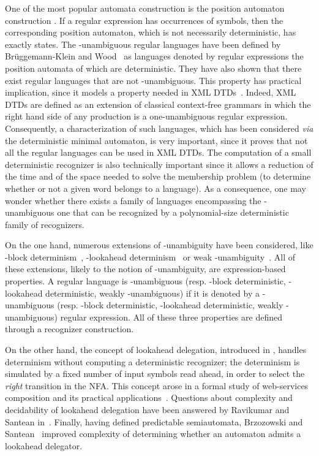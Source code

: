 \documentclass[11pt]{elsarticle}
\newcommand\modif[2]{{#2}}
\begin{document}
One of the \modif{best known}{most popular} automata construction is the position automaton construction \cite{Glu61}. If a regular expression has  occurrences of symbols, then the corresponding position automaton, which is not necessarily deterministic, has exactly  states.
  The -unambiguous  regular languages have been defined by Br\"uggemann-Klein and Wood~\cite{BW98} as  languages denoted  by  regular expressions  the position automata of which are deterministic. They have also shown that there exist regular languages that are not -unambiguous. This property has practical implication, since it models a property needed in XML DTDs~\cite{BPS06}. Indeed, XML DTDs are defined as an extension of classical context-free grammars in which the right hand side of any production is a one-unambiguous regular expression. 
   Consequently, \modif{}{a} characterization of such languages, \modif{that}{which} has been considered \emph{via} the deterministic minimal automaton, is very important, since it proves that not all the regular languages can be used in XML DTDs.  
  The computation of a small deterministic recognizer is also technically important since it allows a reduction of the time and of the space needed to solve the membership problem (to determine whether or not a given word belongs to a language).
   As a consequence, one may wonder whether there exists a family of languages encompassing the -unambiguous one that can be recognized by a polynomial-size deterministic family of recognizers.


  On the one hand, numerous extensions of -unambiguity have been considered, like -block determinism~\cite{GMW01}, -lookahead determinism~\cite{HW08} or weak -unambiguity~\cite{CHM11}. All of these extensions, likely to the notion of -unambiguity, are expression-based properties. A regular language is -unambiguous (resp. -block deterministic, -lookahead deterministic, weakly -unambi\-guous) if it is denoted by a -unambiguous (resp. -block deterministic, -lookahead deterministic, weakly -unambi\-guous) regular expression. All of these three properties are defined through a recognizer construction.
  
  On the other hand, the concept of lookahead delegation, introduced in \cite{DIS04}, handles determinism without computing a deterministic recognizer; the determinism is simulated by a fixed number of input symbols read ahead, in order to select the \emph{right} transition in the NFA. This concept arose in a formal study of web-services composition and its practical applications~\cite{GHIS04}. Questions about complexity and decidability of lookahead delegation have been answered by Ravikumar and Santean in~\cite{RS07}. Finally, having defined predictable semiautomata, Brzozowski and Santean~\cite{BS09} improved complexity of determining whether an automaton admits a lookahead delegator.
  
\end{document}
